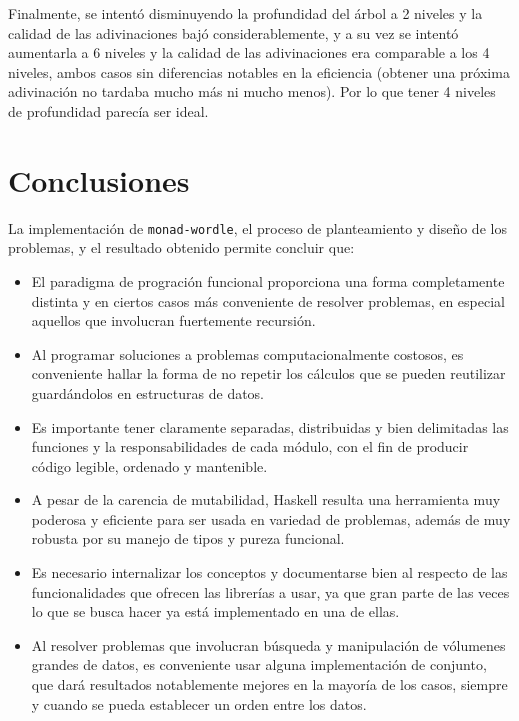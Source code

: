 \documentclass[11pt]{article}
\begin{document}
Finalmente, se intentó disminuyendo la profundidad del árbol a 2 niveles y la
calidad de las adivinaciones bajó considerablemente, y a su vez se intentó
aumentarla a 6 niveles y la calidad de las adivinaciones era comparable a
los 4 niveles, ambos casos sin diferencias notables en la eficiencia (obtener una
próxima adivinación no tardaba mucho más ni mucho menos). Por lo que tener
4 niveles de profundidad parecía ser ideal.

\section{Conclusiones}

La implementación de \texttt{monad-wordle}, el proceso de planteamiento y
diseño de los problemas, y el resultado obtenido permite concluir que:

\begin{itemize}
   \item El paradigma de progración funcional proporciona una forma
   completamente distinta y en ciertos casos más conveniente de resolver
   problemas, en especial aquellos que involucran fuertemente recursión.
   \item Al programar soluciones a problemas computacionalmente costosos,
   es conveniente hallar la forma de no repetir los cálculos que se pueden
   reutilizar guardándolos en estructuras de datos.
   \item Es importante tener claramente separadas, distribuidas y bien delimitadas
   las funciones y la responsabilidades de cada módulo, con el fin de producir código
   legible, ordenado y mantenible.
   \item A pesar de la carencia de mutabilidad, Haskell resulta una herramienta
   muy poderosa y eficiente para ser usada en variedad de problemas, además de
   muy robusta por su manejo de tipos y pureza funcional.
   \item Es necesario internalizar los conceptos y documentarse bien al respecto
   de las funcionalidades que ofrecen las librerías a usar, ya que gran parte de
   las veces lo que se busca hacer ya está implementado en una de ellas.
   \item Al resolver problemas que involucran búsqueda y manipulación de vólumenes grandes de
   datos, es conveniente usar alguna implementación de conjunto, que dará resultados
   notablemente mejores en la mayoría de los casos, siempre y cuando se pueda establecer
   un orden entre los datos.
\end{itemize}
\end{document}
